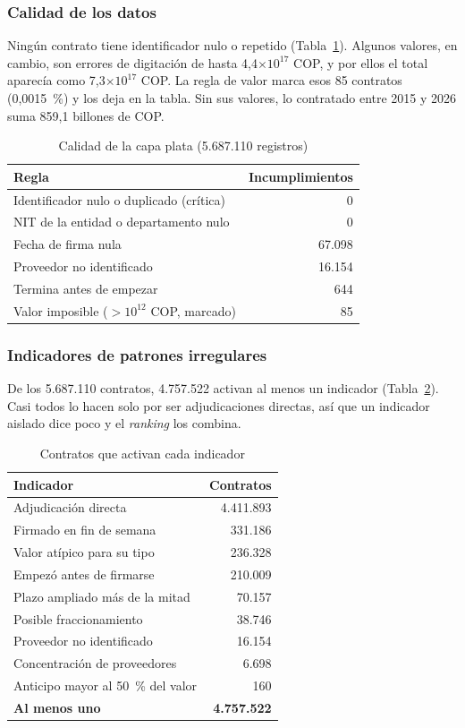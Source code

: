 \subsubsection{Calidad de los datos}

Ningún contrato tiene identificador nulo o repetido (Tabla~\ref{adq:t6}). Algunos valores, en cambio, son errores de digitación de hasta 4,4$\times 10^{17}$ COP, y por ellos el total aparecía como 7,3$\times 10^{17}$ COP. La regla de valor marca esos 85 contratos (0,0015~\%) y los deja en la tabla. Sin sus valores, lo contratado entre 2015 y 2026 suma 859,1 billones de COP.

\begin{table}[!htbp]
\centering
\small
\caption{Calidad de la capa plata (5.687.110 registros)}\label{adq:t6}
\begin{tabular}{lr}
\toprule
Regla & Incumplimientos \\
\midrule
Identificador nulo o duplicado (crítica) & 0 \\
NIT de la entidad o departamento nulo & 0 \\
Fecha de firma nula & 67.098 \\
Proveedor no identificado & 16.154 \\
Termina antes de empezar & 644 \\
Valor imposible ($> 10^{12}$ COP, marcado) & 85 \\
\bottomrule
\end{tabular}
\end{table}

\subsubsection{Indicadores de patrones irregulares}

De los 5.687.110 contratos, 4.757.522 activan al menos un indicador (Tabla~\ref{adq:t7}). Casi todos lo hacen solo por ser adjudicaciones directas, así que un indicador aislado dice poco y el \emph{ranking} los combina.

\begin{table}[!htbp]
\centering
\small
\caption{Contratos que activan cada indicador}\label{adq:t7}
\begin{tabular}{lr}
\toprule
Indicador & Contratos \\
\midrule
Adjudicación directa & 4.411.893 \\
Firmado en fin de semana & 331.186 \\
Valor atípico para su tipo & 236.328 \\
Empezó antes de firmarse & 210.009 \\
Plazo ampliado más de la mitad & 70.157 \\
Posible fraccionamiento & 38.746 \\
Proveedor no identificado & 16.154 \\
Concentración de proveedores & 6.698 \\
Anticipo mayor al 50~\% del valor & 160 \\
\textbf{Al menos uno} & \textbf{4.757.522} \\
\bottomrule
\end{tabular}
\end{table}

